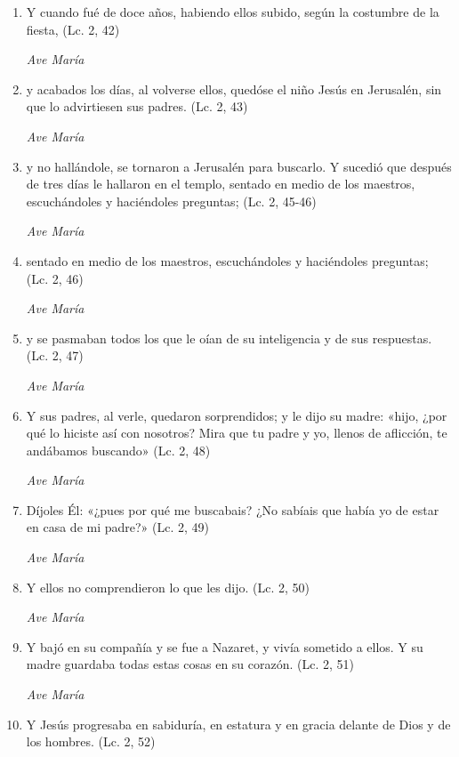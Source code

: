 \documentclass[a4paper,11pt, oneside]{report}
\begin{document}
        \begin{enumerate}

          \item Y cuando fué de doce años, habiendo ellos subido, según la costumbre de la fiesta, (Lc. 2, 42)
          
          \textit{Ave María}

          \item y acabados los días, al volverse ellos, quedóse el niño Jesús en Jerusalén, sin que lo advirtiesen sus padres. (Lc. 2, 43)
          
          \textit{Ave María}

          \item y no hallándole, se tornaron a Jerusalén para buscarlo. Y sucedió que después de tres días le hallaron en el templo,
          sentado en medio de los maestros, escuchándoles y haciéndoles preguntas; (Lc. 2, 45-46)
          
          \textit{Ave María}

          \item sentado en medio de los maestros, escuchándoles y haciéndoles preguntas; (Lc. 2, 46)
          
          \textit{Ave María}

          \item y se pasmaban todos los que le oían de su inteligencia y de sus respuestas. (Lc. 2, 47)

          \textit{Ave María}

          \item Y sus padres, al verle, quedaron sorprendidos; y le dijo su madre: «hijo, ¿por qué lo hiciste así con nosotros? Mira que tu padre
          y yo, llenos de aflicción, te andábamos buscando» (Lc. 2, 48)
          
          \textit{Ave María}

          \item Díjoles Él: «¿pues por qué me buscabais? ¿No sabíais que había yo de estar en casa de mi padre?» (Lc. 2, 49)
          
          \textit{Ave María}

          \item Y ellos no comprendieron lo que les dijo. (Lc. 2, 50)
          
          \textit{Ave María}

          \item Y bajó en su compañía y se fue a Nazaret, y vivía sometido a ellos. Y su madre guardaba todas estas
          cosas en su corazón. (Lc. 2, 51)
          
          \textit{Ave María}

          \item Y Jesús progresaba en sabiduría, en estatura y en gracia delante de Dios y de los hombres. (Lc. 2, 52)

        \end{enumerate}
\end{document}
